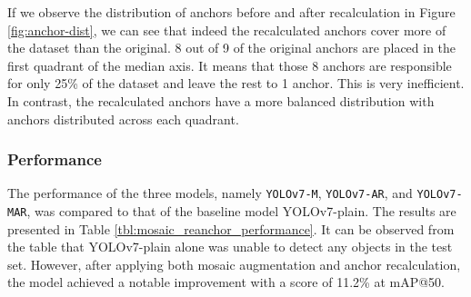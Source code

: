 If we observe the distribution of anchors before and after recalculation in Figure \ref{fig:anchor-dist},
we can see that indeed the recalculated anchors cover more of the dataset than the original.
8 out of 9 of the original anchors are placed in the first quadrant of the median axis.
It means that those 8 anchors are responsible for only 25\% of the dataset and leave the rest to 1 anchor.
This is very inefficient. In contrast, the recalculated anchors have a more balanced distribution with
anchors distributed across each quadrant.





\subsubsection{Performance}
The performance of the three models, namely \verb|YOLOv7-M|, \verb|YOLOv7-AR|, and \verb|YOLOv7-MAR|, was compared to that of the baseline model YOLOv7-plain.
The results are presented in Table \ref{tbl:mosaic_reanchor_performance}.
It can be observed from the table that YOLOv7-plain alone was unable to detect any objects in the test set.
However, after applying both mosaic augmentation and anchor recalculation, the model achieved a notable improvement with a score of 11.2\% at mAP@50. 

\begin{table}[H]
  \centering
  \label{tbl:mosaic_reanchor_performance}
  \vspace{-1ex}
  
\end{table}

